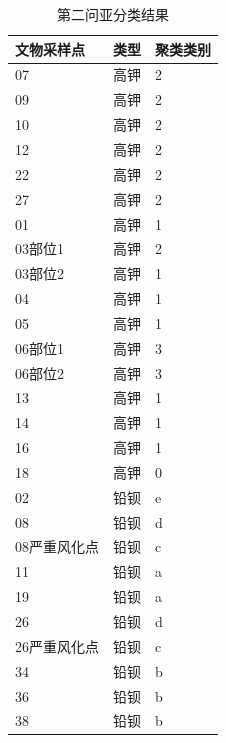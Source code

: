 \documentclass[UTF8]{ctexart}
\begin{document}
\begin{table}[H]
    \centering
    \caption{第二问亚分类结果}
    \begin{tabular}{|l|l|l|}
        \hline
        文物采样点   & 类型 & 聚类类别 \\ \hline
        07           & 高钾 & 2        \\ \hline
        09           & 高钾 & 2        \\ \hline
        10           & 高钾 & 2        \\ \hline
        12           & 高钾 & 2        \\ \hline
        22           & 高钾 & 2        \\ \hline
        27           & 高钾 & 2        \\ \hline
        01           & 高钾 & 1        \\ \hline
        03部位1      & 高钾 & 2        \\ \hline
        03部位2      & 高钾 & 1        \\ \hline
        04           & 高钾 & 1        \\ \hline
        05           & 高钾 & 1        \\ \hline
        06部位1      & 高钾 & 3        \\ \hline
        06部位2      & 高钾 & 3        \\ \hline
        13           & 高钾 & 1        \\ \hline
        14           & 高钾 & 1        \\ \hline
        16           & 高钾 & 1        \\ \hline
        18           & 高钾 & 0        \\ \hline
        02           & 铅钡 & e        \\ \hline
        08           & 铅钡 & d        \\ \hline
        08严重风化点 & 铅钡 & c        \\ \hline
        11           & 铅钡 & a        \\ \hline
        19           & 铅钡 & a        \\ \hline
        26           & 铅钡 & d        \\ \hline
        26严重风化点 & 铅钡 & c        \\ \hline
        34           & 铅钡 & b        \\ \hline
        36           & 铅钡 & b        \\ \hline
        38           & 铅钡 & b        \\ \hline

\end{tabular}
\end{table}
\end{document}
